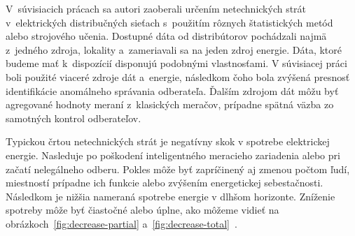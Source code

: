 \documentclass[a4paper,twoside,slovak,12pt,appendix]{article}
\begin{document}
V~súvisiacich prácach sa autori zaoberali určením netechnických strát
v~elektrických distribučných sieťach s~použitím rôznych štatistických metód
alebo strojového učenia. Dostupné dáta od distribútorov pochádzali najmä
z~jedného zdroja, lokality a~zameriavali sa na jeden zdroj energie. Dáta, ktoré
budeme mať k~dispozícií disponujú podobnými vlastnosťami. V súvisiacej
práci~\cite{Coma-Puig2016} boli použité viaceré zdroje dát a~energie, následkom
čoho bola zvýšená presnosť identifikácie anomálneho správania odberateľa.
Ďalším zdrojom dát môžu byť agregované hodnoty meraní z~klasických meračov,
prípadne spätná väzba zo samotných kontrol odberateľov.

Typickou črtou netechnických strát je negatívny skok v spotrebe elektrickej
energie. Nasleduje po poškodení inteligentného meracieho zariadenia alebo pri
začatí nelegálneho odberu. Pokles môže byť zapríčinený aj zmenou počtom ľudí,
miestností prípadne ich funkcie alebo zvýšením energetickej sebestačnosti.
Následkom je nižšia nameraná spotrebe energie v dlhšom horizonte. Zníženie
spotreby môže byť čiastočné alebo úplne, ako môžeme
vidieť na obrázkoch~\ref{fig:decrease-partial}
a~\ref{fig:decrease-total}~\cite{Spiric2015,Trevizan2015}.
\end{document}
